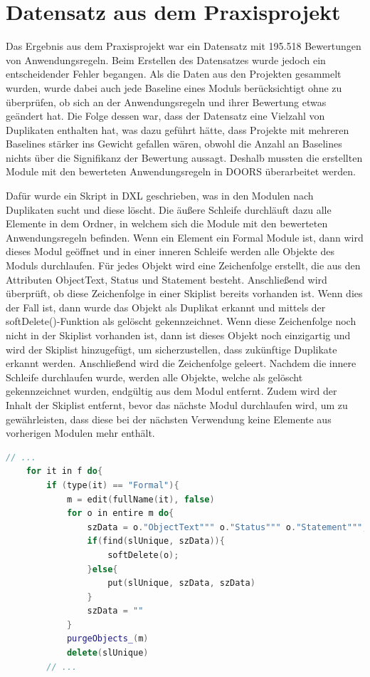 \section{Datensatz aus dem Praxisprojekt}
\label{chap:DataPraxisprojekt}
Das Ergebnis aus dem Praxisprojekt war ein Datensatz mit 195.518 Bewertungen von Anwendungsregeln. Beim Erstellen des Datensatzes wurde jedoch ein entscheidender Fehler begangen.
Als die Daten aus den Projekten gesammelt wurden, wurde dabei auch jede Baseline eines Moduls berücksichtigt ohne zu überprüfen, ob sich an der Anwendungsregeln und ihrer Bewertung
etwas geändert hat. Die Folge dessen war, dass der Datensatz eine Vielzahl von Duplikaten enthalten hat, was dazu geführt hätte, dass Projekte mit mehreren Baselines 
stärker ins Gewicht gefallen wären, obwohl die Anzahl an Baselines nichts über die Signifikanz der Bewertung aussagt. Deshalb mussten die erstellten Module mit den bewerteten Anwendungsregeln
in \ac{DOORS} überarbeitet werden. 

Dafür wurde ein Skript in \ac{DXL} geschrieben, was in den Modulen nach Duplikaten sucht und diese löscht. Die äußere Schleife durchläuft dazu alle 
Elemente in dem Ordner, in welchem sich die Module mit den bewerteten Anwendungsregeln befinden. Wenn ein Element ein Formal Module ist, 
dann wird dieses Modul geöffnet und in einer inneren Schleife werden alle Objekte des Moduls durchlaufen. Für jedes Objekt wird eine 
Zeichenfolge erstellt, die aus den Attributen ObjectText, Status und Statement besteht. Anschließend wird überprüft, ob diese Zeichenfolge
in einer Skiplist bereits vorhanden ist. Wenn dies der Fall ist, dann wurde das Objekt als Duplikat erkannt und mittels der softDelete()-Funktion
als gelöscht gekennzeichnet. Wenn diese Zeichenfolge noch nicht in der Skiplist vorhanden ist, dann ist dieses Objekt noch einzigartig und wird der Skiplist
hinzugefügt, um sicherzustellen, dass zukünftige Duplikate erkannt werden. Anschließend wird die Zeichenfolge geleert. Nachdem die innere Schleife durchlaufen wurde,
werden alle Objekte, welche als gelöscht gekennzeichnet wurden, endgültig aus dem Modul entfernt. Zudem wird der Inhalt der Skiplist entfernt, bevor das nächste Modul durchlaufen wird, um 
zu gewährleisten, dass diese bei der nächsten Verwendung keine Elemente aus vorherigen Modulen mehr enthält.

\begin{lstlisting}[language = C++, caption={Duplikate in Modulen löschen},captionpos=b, label = lst:deleteDuplicates, float, floatplacement=H]
    // ...
    for it in f do{
        if (type(it) == "Formal"){
            m = edit(fullName(it), false)
            for o in entire m do{
                szData = o."ObjectText""" o."Status""" o."Statement""";
                if(find(slUnique, szData)){
                    softDelete(o);
                }else{
                    put(slUnique, szData, szData)
                }
                szData = "" 
            }
            purgeObjects_(m)
            delete(slUnique)
        // ...
\end{lstlisting}

